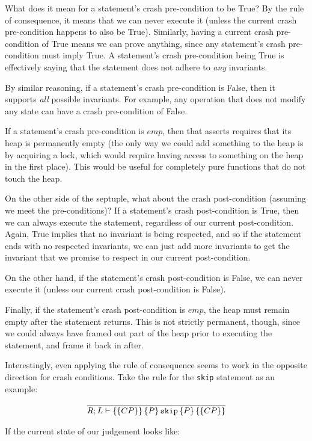 What does it mean for a statement's crash pre-condition to be True? By the rule
of consequence, it means that we can never execute it (unless the current crash
pre-condition happens to also be True). Similarly, having a current crash
pre-condition of True means we can prove anything, since any statement's crash
pre-condition must imply True. A statement's crash pre-condition being True is
effectively saying that the statement does not adhere to \textit{any}
invariants.

By similar reasoning, if a statement's crash pre-condition is False, then it
supports \textit{all} possible invariants. For example, any operation that does
not modify any state can have a crash pre-condition of False.

If a statement's crash pre-condition is $emp$, then that asserts requires that
its heap is permanently empty (the only way we could add something to the heap
is by acquiring a lock, which would require having access to something on the
heap in the first place). This would be useful for completely pure functions
that do not touch the heap.

On the other side of the septuple, what about the crash post-condition (assuming
we meet the pre-conditions)? If a statement's crash post-condition is True, then
we can always execute the statement, regardless of our current post-condition.
Again, True implies that no invariant is being respected, and so if the
statement ends with no respected invariants, we can just add more invariants to
get the invariant that we promise to respect in our current post-condition.

On the other hand, if the statement's crash post-condition is False, we can
never execute it (unless our current crash post-condition is False).

Finally, if the statement's crash post-condition is $emp$, the heap must remain
empty after the statement returns. This is not strictly permanent, though, since we
could always have framed out part of the heap prior to executing the statement,
and frame it back in after.

Interestingly, even applying the rule of consequence seems to work in the
opposite direction for crash conditions. Take the rule for the \texttt{skip}
statement as an example:

\begin{gather*}
    \infer{\hoarestmt{R}{L}{CP}{P}{\texttt{skip}}{P}{CP}}{}
\end{gather*}

If the current state of our judgement looks like:

